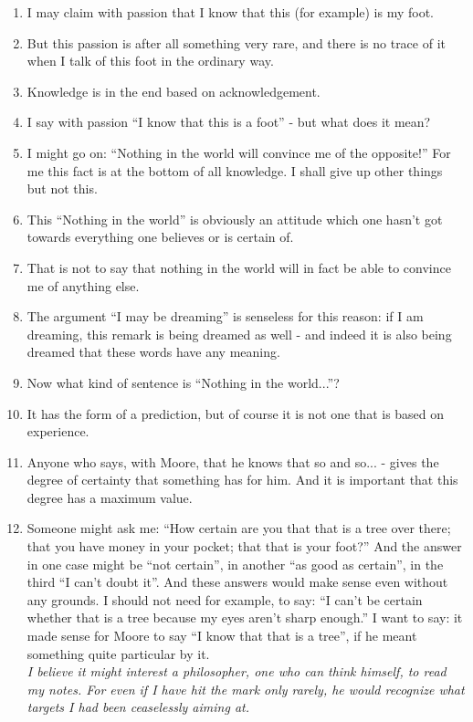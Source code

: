 \documentclass{book}
\begin{document}
\begin{enumerate}
\item
I may claim with passion that I know that this (for example) is my foot.

\item
But this passion is after all something very rare, and there is no trace of it
when I talk of this foot in the ordinary way.

\item
Knowledge is in the end based on acknowledgement.

\item
I say with passion ``I know that this is a foot'' - but what does it mean?

\item
I might go on: ``Nothing in the world will convince me of the opposite!'' For
me this fact is at the bottom of all knowledge. I shall give up other things
but not this.

\item
This ``Nothing in the world'' is obviously an attitude which one hasn't got
towards everything one believes or is certain of.

\item
That is not to say that nothing in the world will in fact be able to convince
me of anything else.

\item
The argument ``I may be dreaming'' is senseless for this reason: if I am
dreaming, this remark is being dreamed as well - and indeed it is also being
dreamed that these words have any meaning.

\item
Now what kind of sentence is ``Nothing in the world...''?

\item
It has the form of a prediction, but of course it is not one that is based on
experience.

\item
Anyone who says, with Moore, that he knows that so and so... - gives the degree
of certainty that something has for him. And it is important that this degree
has a maximum value.

\item
Someone might ask me: ``How certain are you that that is a tree over there;
that you have money in your pocket; that that is your foot?'' And the answer in
one case might be ``not certain'', in another ``as good as certain'', in the
third ``I can't doubt it''. And these answers would make sense even without any
grounds. I should not need for example, to say: ``I can't be certain whether
that is a tree because my eyes aren't sharp enough.'' I want to say: it made
sense for Moore to say ``I know that that is a tree'', if he meant something
quite particular by it.
\\
\emph{I believe it might interest a philosopher, one who can think himself, to
read my notes. For even if I have hit the mark only rarely, he would recognize
what targets I had been ceaselessly aiming at.}


\end{enumerate}
\end{document}
